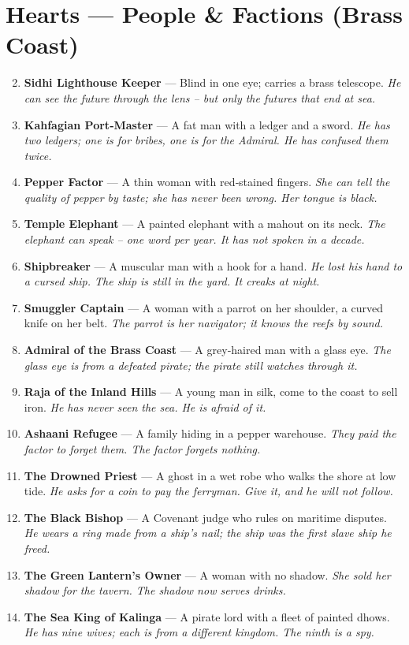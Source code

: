 \documentclass[11pt]{book}
\begin{document}
\section*{Hearts — People \& Factions (Brass Coast)}
\begin{enumerate}
\setcounter{enumi}{1}
\item \textbf{Sidhi Lighthouse Keeper} — Blind in one eye; carries a brass telescope. \textit{He can see the future through the lens – but only the futures that end at sea.}
\item \textbf{Kahfagian Port‑Master} — A fat man with a ledger and a sword. \textit{He has two ledgers; one is for bribes, one is for the Admiral. He has confused them twice.}
\item \textbf{Pepper Factor} — A thin woman with red‑stained fingers. \textit{She can tell the quality of pepper by taste; she has never been wrong. Her tongue is black.}
\item \textbf{Temple Elephant} — A painted elephant with a mahout on its neck. \textit{The elephant can speak – one word per year. It has not spoken in a decade.}
\item \textbf{Shipbreaker} — A muscular man with a hook for a hand. \textit{He lost his hand to a cursed ship. The ship is still in the yard. It creaks at night.}
\item \textbf{Smuggler Captain} — A woman with a parrot on her shoulder, a curved knife on her belt. \textit{The parrot is her navigator; it knows the reefs by sound.}
\item \textbf{Admiral of the Brass Coast} — A grey‑haired man with a glass eye. \textit{The glass eye is from a defeated pirate; the pirate still watches through it.}
\item \textbf{Raja of the Inland Hills} — A young man in silk, come to the coast to sell iron. \textit{He has never seen the sea. He is afraid of it.}
\item \textbf{Ashaani Refugee} — A family hiding in a pepper warehouse. \textit{They paid the factor to forget them. The factor forgets nothing.}
\item[J] \textbf{The Drowned Priest} — A ghost in a wet robe who walks the shore at low tide. \textit{He asks for a coin to pay the ferryman. Give it, and he will not follow.}
\item[Q] \textbf{The Black Bishop} — A Covenant judge who rules on maritime disputes. \textit{He wears a ring made from a ship’s nail; the ship was the first slave ship he freed.}
\item[K] \textbf{The Green Lantern’s Owner} — A woman with no shadow. \textit{She sold her shadow for the tavern. The shadow now serves drinks.}
\item[A] \textbf{The Sea King of Kalinga} — A pirate lord with a fleet of painted dhows. \textit{He has nine wives; each is from a different kingdom. The ninth is a spy.}
\end{enumerate}
\end{document}
